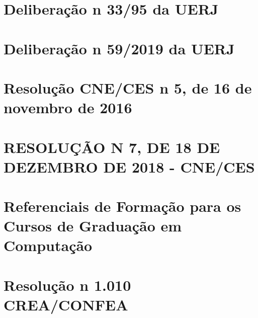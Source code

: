 
\chapter{Deliberação n\textordmasculine{} 33/95 da UERJ}
\label{delib3395}
%


\chapter{Deliberação n\textordmasculine{} 59/2019 da UERJ}
\label{delib592019}
%


\chapter{Resolução CNE/CES n\textordmasculine{} 5, de 16 de novembro de 2016}
\label{cne2016}

%

\chapter{RESOLUÇÃO N\textordmasculine{} 7, DE 18 DE DEZEMBRO DE 2018 - CNE/CES}
\label{rcne2018}


\chapter{Referenciais de Formação para os Cursos de Graduação em Computação}
\label{sbc}


\chapter{Resolução n\textordmasculine{} 1.010 CREA/CONFEA}
\label{res1010}








